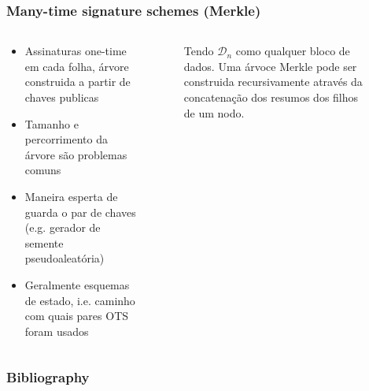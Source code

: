 \documentclass[12pt]{beamer}
\newcommand{\concat}{\, \vert \vert \,}
\newcommand{\hash}[2][]{\mathcal{H}^{#1}(#2)}
\begin{document}
\begin{frame}
  \frametitle{Many-time signature schemes (Merkle)}
  \begin{columns}[T]
    \begin{column}{.45\textwidth}
      \begin{itemize}
        \item Assinaturas one-time em cada folha, árvore construida a partir de chaves publicas
        \item Tamanho e percorrimento da árvore são problemas comuns
        \item Maneira esperta de guarda o par de chaves (e.g. gerador de semente pseudoaleatória)
        \item Geralmente esquemas de estado, i.e. caminho com quais pares OTS foram usados
      \end{itemize}
    \end{column}
    \begin{column}{.4\textwidth}
      \begin{figure}
        \captionsetup{font=scriptsize}
        \caption*{Tendo $\mathcal{D}_n$ como qualquer bloco de dados. Uma árvoce Merkle pode ser construida recursivamente através da concatenação dos resumos dos filhos de um nodo.}
      \end{figure}
    \end{column}
  \end{columns}
\end{frame}

\begin{frame}
  \frametitle{Bibliography}
  
  
\end{frame}
\end{document}
